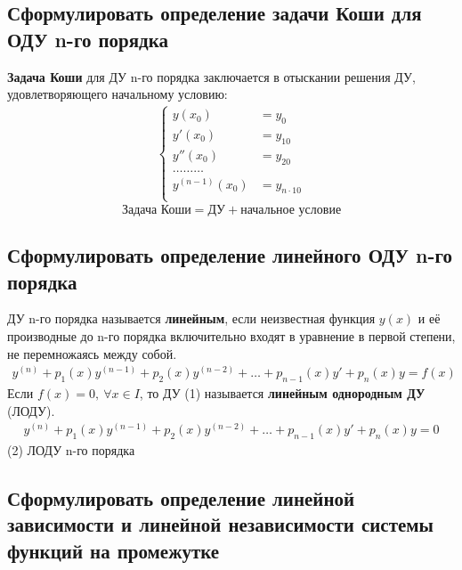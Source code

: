 \subsection{Сформулировать определение задачи Коши для ОДУ n-го порядка}

\begin{definition*}
    \textbf{Задача Коши} для ДУ n-го порядка заключается в отыскании решения ДУ, удовлетворяющего начальному условию:
    \begin{gather*}
        \left\{ \begin{aligned}
            y(x_0) &= y_0 \\
            y'(x_0) &= y_{10} \\
            y''(x_0) &= y_{20} \\
            \ldots\ldots\ldots \\
            y^{(n-1)}(x_0) &= y_{n\cdot 10} \\
        \end{aligned} \right.
    \end{gather*}
    \[
        \text{Задача Коши} = \text{ДУ} + \text{начальное условие}
    \]
\end{definition*}

\subsection{Сформулировать определение линейного ОДУ n-го порядка}

\begin{definition*}
    ДУ n-го порядка называется \textbf{линейным}, если неизвестная функция $y(x)$ и её производные до n-го порядка включительно входят в уравнение в первой степени, не перемножаясь между собой.
    \begin{gather}
        \boxed{y^{(n)} + p_1(x)y^{(n-1)}  + p_2(x)y^{(n-2)} + \ldots + p_{n-1}(x)y' + p_n(x)y = f(x)}
    \end{gather}
    Если $f(x) = 0,\ \forall x \in I$, то ДУ (1) называется \textbf{линейным однородным ДУ} (ЛОДУ).
    \begin{gather}
        \boxed{y^{(n)} + p_1(x)y^{(n-1)}  + p_2(x)y^{(n-2)} + \ldots + p_{n-1}(x)y' + p_n(x)y = 0}
    \end{gather}
    (2) ЛОДУ n-го порядка
\end{definition*}

\subsection{Сформулировать определение линейной зависимости и линейной независимости системы функций на промежутке}

